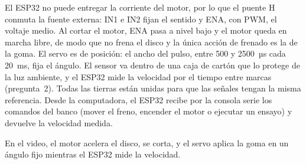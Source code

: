 El ESP32 no puede entregar la corriente del motor, por lo que el puente H conmuta la fuente
externa: IN1 e IN2 fijan el sentido y ENA, con PWM, el voltaje medio. Al cortar el motor, ENA pasa
a nivel bajo y el motor queda en marcha libre, de modo que no frena el disco y la única acción de
frenado es la de la goma. El servo es de posición: el ancho del pulso, entre 500 y 2500~µs cada
20~ms, fija el ángulo. El sensor va dentro de una caja de cartón que lo protege de la luz ambiente,
y el ESP32 mide la velocidad por el tiempo entre marcas (pregunta~2). Todas las tierras están
unidas para que las señales tengan la misma referencia. Desde la computadora, el ESP32 recibe por
la consola serie los comandos del banco (mover el freno, encender el motor o ejecutar un ensayo) y
devuelve la velocidad medida.

En el video, el motor acelera el disco, se corta, y el servo aplica la goma en un ángulo fijo
mientras el ESP32 mide la velocidad.
